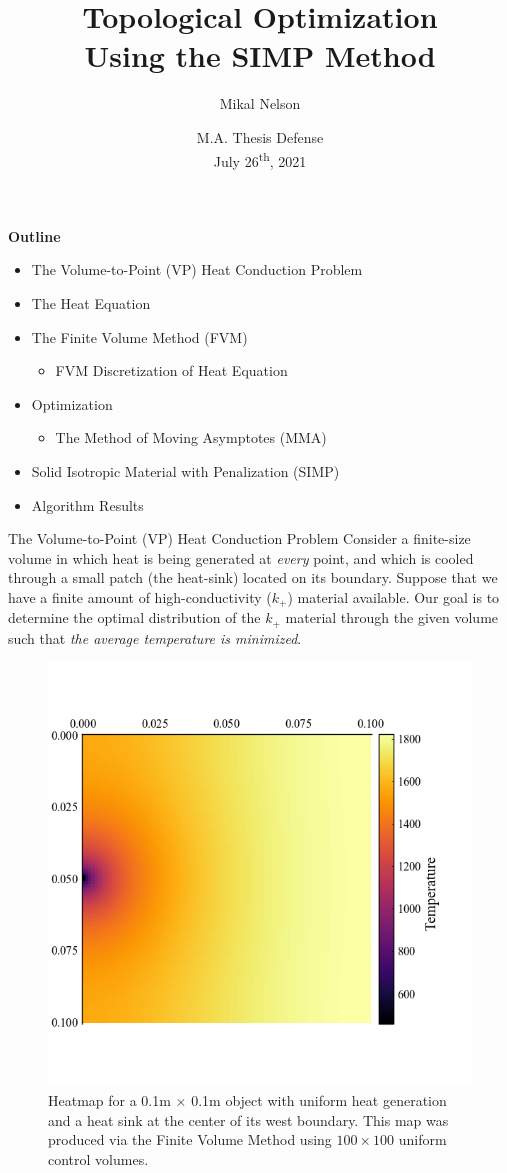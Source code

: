 \documentclass[final]{beamer}
\title[SIMP Optimization]{\bf Topological Optimization\\Using the SIMP Method}
\author[Mikal Nelson]{Mikal Nelson
}
\institute[KU]{
{University of Kansas}\\
Department of Mathematics\\
mikal.nelson@ku.edu\\
}
\date[M.A. Thesis Defense]{
\small M.A. Thesis Defense\\
July 26\textsuperscript{th}, 2021
}
\begin{document}
\begin{frame}
	\titlepage
\end{frame}

\begin{frame}{\textbf{Outline}}
	\begin{itemize}
		\item The Volume-to-Point (VP) Heat Conduction Problem
		\item The Heat Equation
		\item The Finite Volume Method (FVM)
		\begin{itemize}
			\item FVM Discretization of Heat Equation
		\end{itemize}
		\item Optimization
		\begin{itemize}
			\item The Method of Moving Asymptotes (MMA)
		\end{itemize}
		\item Solid Isotropic Material with Penalization (SIMP)
		\item Algorithm Results
	\end{itemize}
\end{frame}

\begin{frame}[t]{The Volume-to-Point (VP) Heat Conduction Problem}
	\pause
	Consider a finite-size volume in which heat is being generated at \textit{every} point, and which is cooled through a small patch (the heat-sink) located on its boundary.
	\pause
	\vfill
	Suppose that we have a finite amount of high-conductivity ($k_+$) material available.
	\vfill
	\pause
	Our goal is to determine the optimal distribution of the $k_+$ material through the given volume such that \textit{the average temperature is minimized}.\vfill
\end{frame}

\begin{frame}
	\begin{figure}
		\centering
		\includegraphics[height=0.65\textwidth]{Heatmap_Example.png}
		\caption[Heatmap Example]{Heatmap for a 0.1m $\times$ 0.1m object with uniform heat generation and a heat sink at the center of its west boundary. This map was produced via the Finite Volume Method using $100\times 100$ uniform control volumes.}
		\label{fig:heatmap-example}
	\end{figure}
\end{frame}
\end{document}
